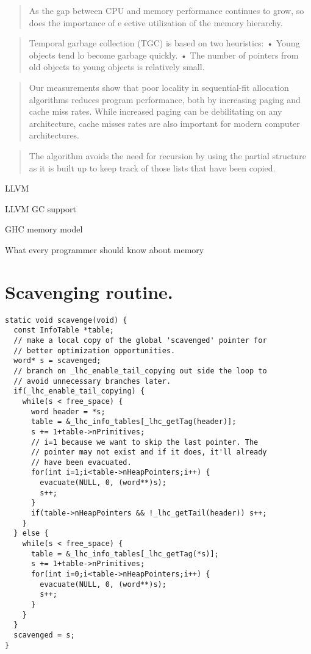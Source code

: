 \documentclass[a4paper,oneside]{memoir}
\begin{document}
\blockquote{As the gap between CPU and memory performance continues to grow, so
does the importance of e ective utilization of the memory hierarchy.}
\cite{Eiron:1999}

\blockquote{Temporal garbage collection (TGC) is based on two heuristics:
• Young objects tend lo become garbage quickly.
• The number of pointers from old objects to young objects is relatively small.}
\cite{Courts:1988}

\blockquote{Our measurements show that poor locality in sequential-fit
allocation algorithms reduces program performance, both by increasing paging
and cache miss rates. While increased paging can be debilitating on any
architecture, cache misses rates are also important for modern computer
architectures. \cite{Grunwald:1993}}

\blockquote{The algorithm avoids the need for recursion by using the partial
structure as it is built up to keep track of those lists that have been copied.}
\cite{Cheney:1970}

LLVM\cite{LLVM}

LLVM GC support\cite{LLVMGC}

GHC memory model \cite{GHCCommentary}

What every programmer should know about memory \cite{Drepper}




\appendix
\lstset{language=c}

\chapter{Scavenging routine.}
\label{scavenge_code}

\begin{lstlisting}
static void scavenge(void) {
  const InfoTable *table;
  // make a local copy of the global 'scavenged' pointer for
  // better optimization opportunities.
  word* s = scavenged;
  // branch on _lhc_enable_tail_copying out side the loop to
  // avoid unnecessary branches later.
  if(_lhc_enable_tail_copying) {
    while(s < free_space) {
      word header = *s;
      table = &_lhc_info_tables[_lhc_getTag(header)];
      s += 1+table->nPrimitives;
      // i=1 because we want to skip the last pointer. The
      // pointer may not exist and if it does, it'll already
      // have been evacuated.
      for(int i=1;i<table->nHeapPointers;i++) {
        evacuate(NULL, 0, (word**)s);
        s++;
      }
      if(table->nHeapPointers && !_lhc_getTail(header)) s++;
    }
  } else {
    while(s < free_space) {
      table = &_lhc_info_tables[_lhc_getTag(*s)];
      s += 1+table->nPrimitives;
      for(int i=0;i<table->nHeapPointers;i++) {
        evacuate(NULL, 0, (word**)s);
        s++;
      }
    }
  }
  scavenged = s;
}
\end{lstlisting}
\end{document}
